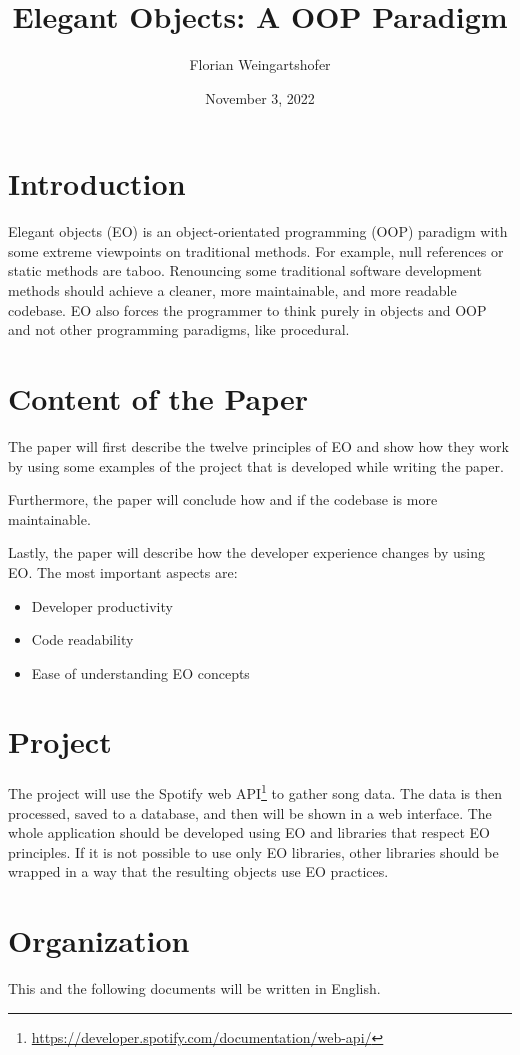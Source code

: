 \documentclass[11pt]{article}
\title{Elegant Objects: A OOP Paradigm}
\author{Florian Weingartshofer}
\date{November 3, 2022}
\begin{document}
    \maketitle


    \section{Introduction}\label{sec:motivation}
    Elegant objects (\gls{EO}) is an object-orientated programming (\gls{OOP}) paradigm with some extreme viewpoints on traditional methods.
    For example, null references or static methods are taboo.
    Renouncing some traditional software development methods should achieve a cleaner, more maintainable, and more readable codebase.
    \Gls{EO} also forces the programmer to think purely in objects and \gls{OOP} and not other programming paradigms, like procedural.



    \section{Content of the Paper}\label{sec:content-of-the-paper}
    The paper will first describe the twelve principles of \gls{EO} and show how they work by using some examples of the project that is developed while writing the paper.

    Furthermore, the paper will conclude how and if the codebase is more maintainable.

    Lastly, the paper will describe how the developer experience changes by using \gls{EO}.
    The most important aspects are:
    \begin{itemize}
        \item Developer productivity
        \item Code readability
        \item Ease of understanding \gls{EO} concepts
    \end{itemize}


    \section{Project}\label{sec:project}
    The project will use the Spotify web \gls{API}\footnote{\url{https://developer.spotify.com/documentation/web-api/}} to gather song data.
    The data is then processed, saved to a database, and then will be shown in a web interface.
    The whole application should be developed using \gls{EO} and libraries that respect EO principles.
    If it is not possible to use only EO libraries, other libraries should be wrapped in a way that the resulting objects use \gls{EO} practices.

    \section{Organization}\label{sec:organization}
    This and the following documents will be written in English.

    \printglossary
\end{document}
